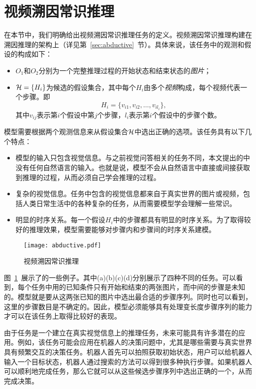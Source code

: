 \section{视频溯因常识推理}\label{sec:definition}

在本节中，我们明确给出视频溯因常识推理任务的定义。视频溯因常识推理构建在溯因推理的架构上（详见第~\ref{sec:abductive}~节）。具体来说，该任务中的观测和假设的构成如下：
\begin{itemize}
    \item $O_1$和$O_2$分别为一个完整推理过程的开始状态和结束状态的\emph{图片}；
    \item ${\mathcal{H}}=\{H_i\}$为候选的假设集合，其中每个$H_i$由多个\emph{视频}构成，每个视频代表一个步骤。即
    \begin{equation}
        H_i = \{v_{i1}, v_{i2}, \ldots, v_{il_i}\},
    \end{equation}
    其中$v_{ij}$表示第$i$个假设中第$j$个步骤，$l_i$表示第$i$个假设中的步骤个数。
\end{itemize}
模型需要根据两个观测信息来从假设集合${\mathcal{H}}$中选出正确的选项。该任务具有以下几个特点：
\begin{itemize}
    \item 模型的输入只包含视觉信息。与之前视觉问答相关的任务不同，本文提出的\VACR 中没有任何自然语言的输入。也就是说，模型不会从自然语言中直接或间接获取到推理的过程，从而必须自己学会推理的过程。
    \item 复杂的视觉信息。任务中包含的视觉信息都来自于真实世界的图片或视频，包括人类日常生活中的各种复杂的任务，从而需要模型学会理解一些常识。
    \item 明显的时序关系。每一个假设$H_i$中的步骤都具有明显的时序关系。为了取得较好的推理效果，模型需要能够对步骤内和步骤间的时序关系建模。
\end{itemize}


\begin{figure}
    \texttt{[image: abductive.pdf]}
    \caption{视频溯因常识推理}
    \label{fig:vacr}
\end{figure}
图~\ref{fig:vacr}~展示了\VACR 的一些例子。其中(a)(b)(c)(d)分别展示了四种不同的任务。可以看到，每个任务中用的已知条件只有开始和结束的两张图片，而中间的步骤是未知的。模型就是要从这两张已知的图片中选出最合适的步骤序列。同时也可以看到，这里的步骤数目是不确定的。因此，模型必须能够具有处理变长度步骤序列的能力才可以在该任务上取得比较好的表现。

由于\VACR 任务是一个建立在真实视觉信息上的推理任务，未来可能具有许多潜在的应用。例如，该任务可能会应用在机器人的决策问题中，尤其是哪些需要与真实世界具有频繁交互的决策任务。机器人首先可以拍照获取初始状态，用户可以给机器人输入一个目标状态，机器人通过搜索的方法可以得到很多种执行步骤。如果机器人可以顺利地完成\VACR 任务，那么它就可以从这些候选步骤序列中选出正确的一个，从而完成决策。

